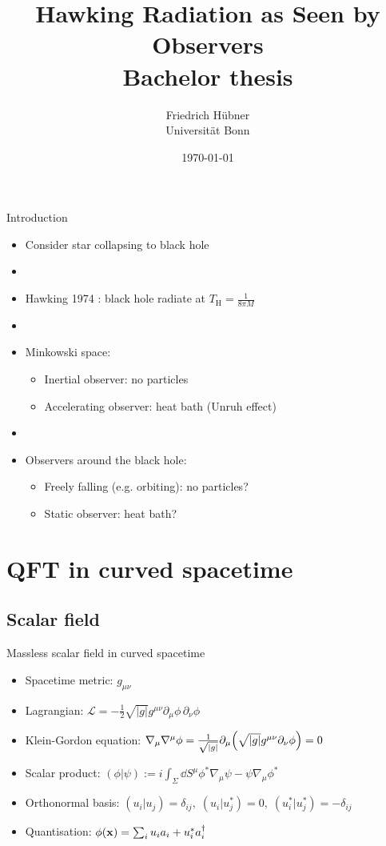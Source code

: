 \documentclass{beamer}
\title[Hawking Radiation for Observers]{\vspace{1cm}Hawking Radiation as Seen by Observers\\\small{Bachelor thesis}}
\author[Friedrich Hübner]{Friedrich Hübner\\Universität Bonn}
\date{\today}
\newcommand{\ind}[1]{_\mathrm{#1}}
\begin{document}
\beamertemplatenavigationsymbolsempty
\titlepage

\begin{frame}{Introduction}
\begin{itemize}
	\item Consider star collapsing to black hole
	\item[]
	\item Hawking 1974 \cite{hawking}: black hole radiate at \(T\ind{H} = \frac{1}{8\pi M}\)
	\item[]
	\item Minkowski space:
		\begin{itemize}
			\item Inertial observer: no particles
			\item Accelerating observer: heat bath (Unruh effect)
		\end{itemize}		 
	\item[]
	\item Observers around the black hole:
		\begin{itemize}
			\item Freely falling (e.g. orbiting): no particles?
			\item Static observer: heat bath?
		\end{itemize}
\end{itemize}
\end{frame}

\frame{\setcounter{tocdepth}{1}\hspace{1cm}\tableofcontents}

\section{QFT in curved spacetime}
\subsection{Scalar field}
\begin{frame}{Massless scalar field in curved spacetime}
\begin{itemize}
	\item Spacetime metric: \(g_{\mu\nu}\)
	\item Lagrangian: \(\mathcal{L} = -\frac{1}{2}\sqrt{|g|} g^{\mu\nu} \partial_\mu \phi\,\partial_\nu \phi\)
	\item Klein-Gordon equation: \(\nabla_\mu\nabla^\mu \phi = \frac{1}{\sqrt{|g|}}\partial_\mu \qty(\sqrt{|g|} g^{\mu\nu} \partial_\nu \phi) = 0\)
	\item Scalar product: \((\phi|\psi) := i \int_{\Sigma}\dd{S^\mu} \phi^*\nabla_\mu \psi - \psi\nabla_\mu \phi^*\)
	\item Orthonormal basis: \((u_i|u_j) = \delta_{ij},\;(u_i|u_j^*) = 0,\;(u_i^*|u_j^*) = -\delta_{ij}\)
	\item Quantisation: \(\phi(\vb{x}) = \sum_i u_i a_i + u_i^*a_i^\dagger\)
\end{itemize}
\end{frame}
\end{document}
